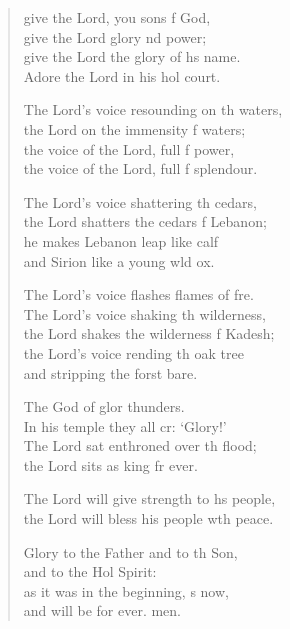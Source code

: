 \settowidth{\versewidth}{The Lord’s voice resounding on the waters, *}
\begin{verse}%
  \begin{patverse}
     give the Lord, you sons f God,\Med\\
    give the Lord glory nd power;\\
give the Lord the glory of h\pointup{\i}s name.\Med\\
    Adore the Lord in his hol court.

The Lord’s voice resounding on th waters,\Med\\
    the Lord on the immensity f waters;\\
the voice of the Lord, full f power,\Med\\
    the voice of the Lord, full f splendour.

The Lord’s voice shattering th cedars,\Med\\
    the Lord shatters the cedars f Lebanon;\\
he makes Lebanon leap like  calf\Med\\
    and Sirion like a young w\pointup{\i}ld ox.

The Lord’s voice flashes flames of f\pointup{\i}re.\Flex\\
    The Lord’s voice shaking th wilderness,\Med\\
    the Lord shakes the wilderness f Kadesh;\\
the Lord’s voice rending th oak tree\Med\\
    and stripping the forst bare.

The God of glor thunders.\Med\\
    In his temple they all cr: ‘Glory!’\\
The Lord sat enthroned over th flood;\Med\\
    the Lord sits as king fr ever.

The Lord will give strength to h\pointup{\i}s people,\Med\\
    the Lord will bless his people w\pointup{\i}th peace.

Glory to the Father and to th Son,\Med\\
    and to the Hol Spirit:\\
as it was in the beginning, \pointup{\i}s now,\Med\\
    and will be for ever. men.
  \end{patverse}
\end{verse}
